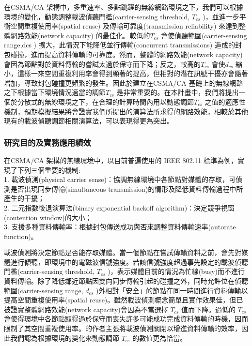 \documentclass[12pt,a4paper]{article}
\begin{document}
\begin{description}
在CSMA/CA 架構中，多重速率、多點跳躍的無線網路環境之下，我們可以根據環境的變化，動態調整載波偵聽門檻(carrier-sensing threshold, $T_{cs}$ )，並進一步平衡空間重複使用率(spatial reuse) 及傳輸可靠度(transmission reliability) 來達到整體網路效能(network capacity) 的最佳化。較低的$T_{cs}$ 會使偵聽範圍(carrier-sensing range,dcs ) 擴大，此情況下能降低並行傳輸(concurrent transmissions) 造成的封包碰撞，進而提高資料傳輸的可靠度。然而，整體的網路效能(network capacity) 會因為節點對於資料傳輸的嘗試太過於保守而下降；反之，較高的$T_{cs}$ 會使$d_{cs}$ 縮小，這樣一來空間重複利用率會得到顯著的提高，但相對的潛在訊號干擾亦會隨著增加，導致封包碰撞更頻繁的發生。因此於建立在CSMA/CA 基礎上的無線網路之下根據當下環境情況適當的調節$T_{cs}$ 是非常重要的。在本計畫中，我們將提出一個於分散式的無線環境之下，在合理的計算時間內用以動態調節$T_{cs}$ 之值的適應性機制，預期模擬結果將會證實我們所提出的演算法所求得的網路效能，相較於其他現有的載波偵聽調節相關演算法，可以表現得更為突出。\\



\subsubsection{研究目的及實務應用績效}%

在CSMA/CA 架構的無線環境中，以目前普遍使用的 IEEE 802.11 標準為例，實現了下列三個重要的機制: \\
1. 載波偵測(physical carrier sense)：協調無線環境中各節點對媒體的存取，可偵測是否出現同步傳輸(simultaneous transmission)的情形及降低資料傳輸過程中所產生的干擾；\\
2. 二元指數後退演算法(binary exponential backoff algorithm)：決定競爭視窗(contention window)的大小；\\
3. 支援多種資料傳輸率：根據封包傳送成功與否來調整資料傳輸速率(autorate function)。

載波偵測將決定節點是否能存取媒體。當一個節點在嘗試傳輸資料之前，會先對媒體進行傾聽，即環境中的電磁波信號強度。若該信號強度超過事先設定的載波偵聽門檻(carrier-sensing threshold, $T_{cs}$ )，表示媒體目前的情況為忙線(busy)而不進行資料傳輸。除了降低鄰近節點因雙向同步傳輸引起的碰撞之外，同時允許位在偵聽範圍(carrier-sensing range, $d_{cs}$ )外相對「安全」的節點在同一時間進行資料傳輸以提高空間重複使用率(spatial reuse)。雖然載波偵測概念簡單且實作效果佳，但已被\cite{sigcomm05_rwpcs}證實整體網路效能(network capacity)會因為不當選擇 $T_{cs}$ 值而下降。過低的 $T_{cs}$ 會使得環境中各節點顯得過於保守而喪失許多可能成功完成資料傳輸的時機，因而限制了其空間重複使用率。\cite{sigcomm05_rwpcs}的作者主張將載波偵測關閉以增進資料傳輸的效率，因此我們認為根據環境的變化來動態調節 $T_{cs}$ 的數值更為恰當。


\end{description}
\end{document}
